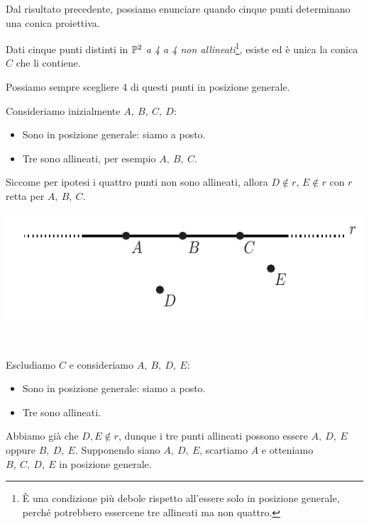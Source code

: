 Dal risultato precedente, possiamo enunciare quando cinque punti determinano una conica proiettiva.
\begin{proposition}
	Dati cinque punti distinti in $\proj[2]{\ }$ \textit{a 4 a 4 non allineati}\footnote{È una condizione più debole rispetto all'essere solo in posizione generale, perché potrebbero essercene tre allineati ma non quattro.}, esiste ed è unica la conica $C$ che li contiene.
\end{proposition}
\begin{demonstration}
	Possiamo sempre scegliere 4 di questi punti in posizione generale.\\
	\begin{minipage}{0.69\textwidth}
	Consideriamo inizialmente $A,\ B,\ C,\ D$:
	\begin{itemize}
	\item Sono in posizione generale: siamo a posto.
	\item Tre sono allineati, per esempio $A,\ B,\ C$.
	\end{itemize}
	Siccome per ipotesi i quattro punti non sono allineati, allora $D\notin r$, $E\notin r$ con $r$ retta per $A,\ B,\ C$.
	\end{minipage}
	\begin{minipage}{0.3\textwidth}
		\includegraphics[trim=0cm 0cm 0cm 0cm,clip,scale=0.50]{images/fivepointconic1.pdf}
	\end{minipage}\\
	\begin{minipage}{0.69\textwidth}
	Escludiamo $C$ e consideriamo $A,\ B,\ D,\ E$:
	\begin{itemize}
		\item Sono in posizione generale: siamo a posto.
		\item Tre sono allineati.
	\end{itemize}
	Abbiamo già che $D,E \notin r$, dunque i tre punti allineati possono essere $A,\ D,\ E$ oppure $B,\ D,\ E$. Supponendo siano $A,\ D,\ E$, scartiamo $A$ e otteniamo $B,\ C,\ D,\ E$ in posizione generale.
	\end{minipage}

\end{demonstration}
